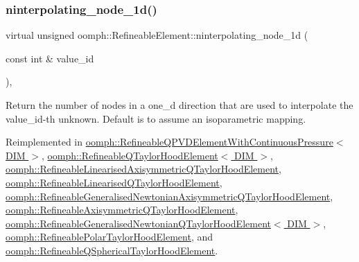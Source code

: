 \subsubsection{\texorpdfstring{ninterpolating\+\_\+node\+\_\+1d()}{ninterpolating\_node\_1d()}}
{\footnotesize\ttfamily virtual unsigned oomph\+::\+Refineable\+Element\+::ninterpolating\+\_\+node\+\_\+1d (\begin{DoxyParamCaption}\item[{const int \&}]{value\+\_\+id }\end{DoxyParamCaption})\hspace{0.3cm}{\ttfamily [inline]}, {\ttfamily [virtual]}}



Return the number of nodes in a one\+\_\+d direction that are used to interpolate the value\+\_\+id-\/th unknown. Default is to assume an isoparametric mapping. 



Reimplemented in \hyperlink{classoomph_1_1RefineableQPVDElementWithContinuousPressure_a9b38f35f3251638b00e5b095f0294e07}{oomph\+::\+Refineable\+Q\+P\+V\+D\+Element\+With\+Continuous\+Pressure$<$ D\+I\+M $>$}, \hyperlink{classoomph_1_1RefineableQTaylorHoodElement_a02da3cfeccf1f235b112db42e0fee9f6}{oomph\+::\+Refineable\+Q\+Taylor\+Hood\+Element$<$ D\+I\+M $>$}, \hyperlink{classoomph_1_1RefineableLinearisedAxisymmetricQTaylorHoodElement_ac8a7cc7bd911f1b9bd5ae859f379948a}{oomph\+::\+Refineable\+Linearised\+Axisymmetric\+Q\+Taylor\+Hood\+Element}, \hyperlink{classoomph_1_1RefineableLinearisedQTaylorHoodElement_ad9f71c10f18b87bd43ade29ba9741665}{oomph\+::\+Refineable\+Linearised\+Q\+Taylor\+Hood\+Element}, \hyperlink{classoomph_1_1RefineableGeneralisedNewtonianAxisymmetricQTaylorHoodElement_ae6aee74598fa32891819c7698be40d72}{oomph\+::\+Refineable\+Generalised\+Newtonian\+Axisymmetric\+Q\+Taylor\+Hood\+Element}, \hyperlink{classoomph_1_1RefineableAxisymmetricQTaylorHoodElement_a7ceb3cf8da736561a0536aec2527ccd7}{oomph\+::\+Refineable\+Axisymmetric\+Q\+Taylor\+Hood\+Element}, \hyperlink{classoomph_1_1RefineableGeneralisedNewtonianQTaylorHoodElement_accecb785cec4dd63c6e4b1804c1697a5}{oomph\+::\+Refineable\+Generalised\+Newtonian\+Q\+Taylor\+Hood\+Element$<$ D\+I\+M $>$}, \hyperlink{classoomph_1_1RefineablePolarTaylorHoodElement_a24cc791779fb7eb9c46875b242715345}{oomph\+::\+Refineable\+Polar\+Taylor\+Hood\+Element}, and \hyperlink{classoomph_1_1RefineableQSphericalTaylorHoodElement_aa722413e544ba7dc9fcd8c42ceb2060d}{oomph\+::\+Refineable\+Q\+Spherical\+Taylor\+Hood\+Element}.



